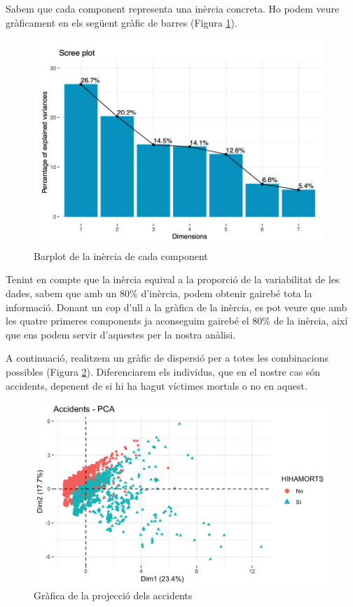\documentclass[12pt,longbibliography]{article}
\theoremstyle{definition}
\theoremstyle{remark}
\begin{document}
Sabem que cada component representa una inèrcia concreta. Ho podem veure gràficament en els següent gràfic de barres (Figura \ref{fig:ACP2}).


\begin{figure}[H]
\begin{center}
\includegraphics[width=11cm]{acp2}
\end{center}
\caption{Barplot de la inèrcia de cada component}
\label{fig:ACP2}
\end{figure}


Tenint en compte que la inèrcia equival a la proporció de la variabilitat de les dades, sabem que amb un 80\% d'inèrcia, podem obtenir gairebé tota la informació. Donant un cop d'ull a la gràfica de la inèrcia, es pot veure que amb les quatre primeres components ja aconseguim gairebé el 80\% de la inèrcia, així que ens podem servir d'aquestes per la nostra anàlisi.



A continuació, realitzem un gràfic de dispersió per a totes les combinacions possibles (Figura \ref{fig:ACP3}). Diferenciarem els individus, que en el nostre cas són accidents, depenent de si hi ha hagut víctimes mortals o no en aquest. 

\begin{figure}[H]
\begin{center}
\includegraphics[width=15cm]{acp3}
\end{center}
\caption{Gràfica de la projecció dels accidents}
\label{fig:ACP3}
\end{figure}
\end{document}
